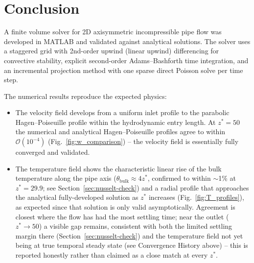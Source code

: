 \documentclass[12pt,a4paper]{article}
\begin{document}
\section{Conclusion}

A finite volume solver for 2D axisymmetric incompressible pipe flow was developed in MATLAB and validated against analytical solutions.
The solver uses a staggered grid with 2nd-order upwind (linear upwind) differencing for convective stability, explicit second-order Adams--Bashforth time integration, and an incremental projection method with one sparse direct Poisson solve per time step.

The numerical results reproduce the expected physics:
\begin{itemize}
    \item The velocity field develops from a uniform inlet profile to the parabolic Hagen--Poiseuille profile within the hydrodynamic entry length. At $z^*=50$ the numerical and analytical
          Hagen--Poiseuille profiles agree to within $\mathcal{O}(10^{-4})$ (Fig.~\ref{fig:w_comparison}) -- the velocity field is essentially fully converged and validated.
    \item The temperature field shows the characteristic linear rise of the bulk temperature along the pipe axis ($\theta_{\text{bulk}}\approx4z^*$, confirmed to within $\sim$1\% at $z^*=29.9$; see
          Section~\ref{sec:nusselt-check}) and a radial profile that approaches the analytical fully-developed solution as $z^*$ increases (Fig.~\ref{fig:T_profiles}), as expected since that solution
          is only valid asymptotically. Agreement is closest where the flow has had the most settling time; near the outlet ($z^*\to50$) a visible gap remains, consistent with both the limited
          settling margin there (Section~\ref{sec:nusselt-check}) and the temperature field not yet being at true temporal steady state (see Convergence History above) -- this is reported honestly
          rather than claimed as a close match at every $z^*$.
\end{itemize}

\newpage

\appendix


\label{app:derivation}
\end{document}
